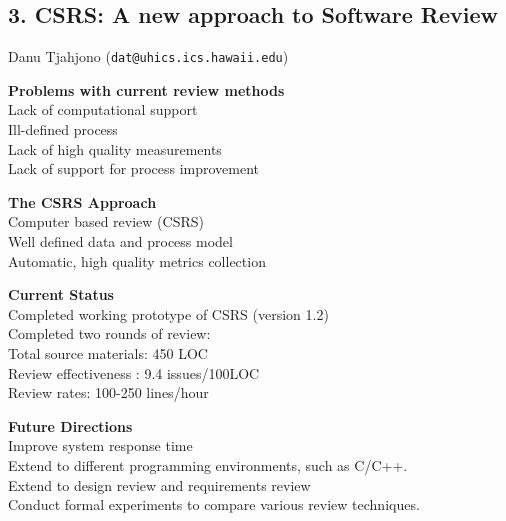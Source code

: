 \subsection*{3. CSRS: A new approach to Software Review}
Danu Tjahjono ({\tt dat@uhics.ics.hawaii.edu})
\begin{itemizenoindent}
\item {\bf Problems with current review methods}\\
 Lack of computational support\\
 Ill-defined process\\
 Lack of high quality measurements \\
 Lack of support for process improvement\\

\item {\bf The CSRS Approach}\\
 Computer based review (CSRS)\\
 Well defined data and process model\\
 Automatic, high quality metrics collection\\

\item {\bf Current Status}\\
 Completed working prototype of CSRS (version 1.2)\\
 Completed two rounds of review:\\
 Total source materials: 450 LOC\\
 Review effectiveness : 9.4 issues/100LOC\\
 Review rates: 100-250 lines/hour\\

\item {\bf Future Directions}\\
 Improve system response time\\
 Extend to different programming environments, such as C/C++.\\
 Extend to design review and requirements review\\
 Conduct formal experiments to compare various review techniques.\\
\end{itemizenoindent}


